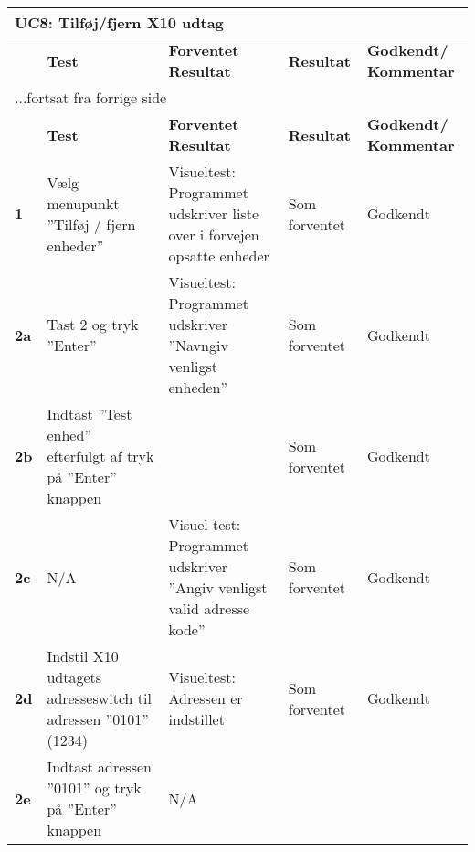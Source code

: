 
\begin{center}
\begin{longtable}{|p{}|p{}|p{}|p{}|p{}|} %
\hline
\multicolumn{5}{|l|}{\textbf{UC8: Tilføj/fjern X10 udtag}} \\ \hline
\multicolumn{1}{|c|}{} &
\textbf{Test} &
\textbf{Forventet \newline Resultat} &
\textbf{Resultat} &
\textbf{Godkendt/ \newline Kommentar} \\ \hline 
\endfirsthead

\multicolumn{5}{l}{...fortsat fra forrige side} \\ \hline 
\multicolumn{1}{|c|}{} &
\textbf{Test} &
\textbf{Forventet \newline Resultat} &
\textbf{Resultat} &
\textbf{Godkendt/ \newline Kommentar} \\ \hline 
\endhead


\textbf{1} &
Vælg menupunkt ''Tilføj / fjern enheder'' &
Visueltest: Programmet udskriver liste over i forvejen opsatte enheder
&Som \newline forventet 
&Godkendt
 \\\hline

\textbf{2a} &
Tast 2 og tryk ''Enter'' &
Visueltest: Programmet udskriver ''Navngiv venligst enheden''
&Som \newline forventet 
&Godkendt
 \\\hline

\textbf{2b} &
Indtast ''Test enhed'' efterfulgt af tryk på ''Enter'' knappen
&
&Som \newline forventet 
&Godkendt
 \\\hline

\textbf{2c} &
N/A & Visuel test: Programmet udskriver ''Angiv venligst valid adresse kode''
&Som \newline forventet 
&Godkendt
 \\\hline

\textbf{2d} &
Indstil X10 udtagets adresseswitch til adressen ''0101'' (1234) &
Visueltest: Adressen er indstillet
&Som \newline forventet 
&Godkendt
 \\\hline

\textbf{2e} &
Indtast adressen ''0101'' og tryk på ''Enter'' knappen &
N/A
& 
&
 \\\hline


\end{longtable}
\end{center}
